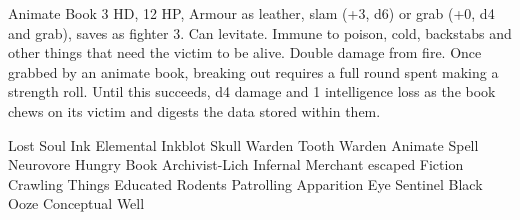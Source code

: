 {Animate Book
3 HD, 12 HP, Armour as leather, slam (+3, d6)
or grab (+0, d4 and grab), saves as fighter 3. Can
levitate. Immune to poison, cold, backstabs and other
things that need the victim to be alive. Double damage
from fire.
Once grabbed by an animate book, breaking out
requires a full round spent making a strength roll.
Until this succeeds, d4 damage and 1 intelligence loss
as the book chews on its victim and digests the data
stored within them.

Lost Soul
Ink Elemental
Inkblot
Skull Warden
Tooth Warden
Animate Spell
Neurovore
Hungry Book
Archivist-Lich
Infernal Merchant
escaped Fiction
Crawling Things
Educated Rodents
Patrolling Apparition
Eye Sentinel
Black Ooze
Conceptual Well



} %
